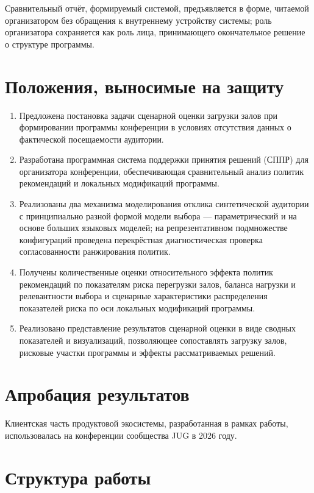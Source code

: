 Сравнительный отчёт, формируемый системой, предъявляется в форме, читаемой организатором без обращения к внутреннему устройству системы; роль организатора сохраняется как роль лица, принимающего окончательное решение о структуре программы.


\section*{Положения, выносимые на защиту}

\begin{enumerate}
\item Предложена постановка задачи сценарной оценки загрузки залов при формировании программы конференции в условиях отсутствия данных о фактической посещаемости аудитории.
\item Разработана программная система поддержки принятия решений (СППР) для организатора конференции, обеспечивающая сравнительный анализ политик рекомендаций и локальных модификаций программы.
\item Реализованы два механизма моделирования отклика синтетической аудитории с принципиально разной формой модели выбора --- параметрический и на основе больших языковых моделей; на репрезентативном подмножестве конфигураций проведена перекрёстная диагностическая проверка согласованности ранжирования политик.
\item Получены количественные оценки относительного эффекта политик рекомендаций по показателям риска перегрузки залов, баланса нагрузки и релевантности выбора и сценарные характеристики распределения показателей риска по оси локальных модификаций программы.
\item Реализовано представление результатов сценарной оценки в виде сводных показателей и визуализаций, позволяющее сопоставлять загрузку залов, рисковые участки программы и эффекты рассматриваемых решений.
\end{enumerate}


\section*{Апробация результатов}

Клиентская часть продуктовой экосистемы, разработанная в рамках работы, использовалась на конференции сообщества JUG в 2026 году.


\section*{Структура работы}

